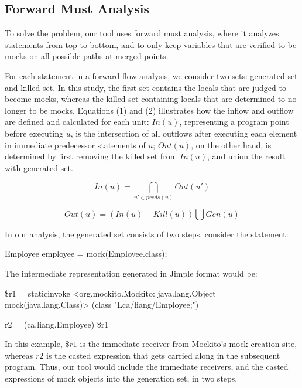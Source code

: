 \subsection{Forward Must Analysis}
\label{subsec:forward}

To solve the problem, our tool uses forward must analysis, where it analyzes statements from top to bottom, and to only keep variables that are verified to be mocks on all possible paths at merged points. 

For each statement in a forward flow analysis, we consider two sets: generated set and killed set. In this study, the first set contains the locals that are judged to become mocks, whereas the killed set containing locals that are determined to no longer to be mocks. Equations (1) and (2) illustrates how the inflow and outflow are defined and calculated for each unit: $In(u)$, representing a program point before executing $u$, is the intersection of all outflows after executing each element in immediate predecessor statements of $u$; $Out(u)$, on the other hand, is determined by first removing the killed set from $In(u)$, and union the result with generated set. 

\begin{equation}
In(u) = \bigcap_{u' \in preds(u)} Out(u') 
\end{equation}

\begin{equation}
Out(u) = (In(u) - Kill(u)) \bigcup Gen(u) 
\end{equation}

In our analysis, the generated set consists of two steps. consider the statement: 
\begin{verbatim*}
Employee employee = mock(Employee.class);
\end{verbatim*}
The intermediate representation generated in Jimple format would be:
\begin{verbatim*}
\$r1 = staticinvoke <org.mockito.Mockito: 
java.lang.Object mock(java.lang.Class)>
(class "Lca/liang/Employee;")

r2 = (ca.liang.Employee) \$r1
\end{verbatim*}

In this example, $\$r1$ is the immediate receiver from Mockito's mock creation site, whereas $r2$ is the casted expression that gets carried along in the subsequent program. Thus, our tool would include the immediate receivers, and the casted expressions of mock objects into the generation set, in two steps. 

